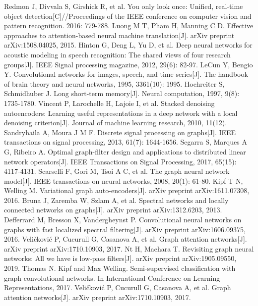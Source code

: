 \cleardoublepage


\begin{thebibliography}{99}  
    Redmon J, Divvala S, Girshick R, et al. You only look once: Unified, real-time object detection[C]//Proceedings of the IEEE conference on computer vision and pattern recognition. 2016: 779-788.  
    Luong M T, Pham H, Manning C D. Effective approaches to attention-based neural machine translation[J]. arXiv preprint arXiv:1508.04025, 2015.
    Hinton G, Deng L, Yu D, et al. Deep neural networks for acoustic modeling in speech recognition: The shared views of four research groups[J]. IEEE Signal processing magazine, 2012, 29(6): 82-97.
    LeCun Y, Bengio Y. Convolutional networks for images, speech, and time series[J]. The handbook of brain theory and neural networks, 1995, 3361(10): 1995. 
    Hochreiter S, Schmidhuber J. Long short-term memory[J]. Neural computation, 1997, 9(8): 1735-1780.
    Vincent P, Larochelle H, Lajoie I, et al. Stacked denoising autoencoders: Learning useful representations in a deep network with a local denoising criterion[J]. Journal of machine learning research, 2010, 11(12).
    Sandryhaila A, Moura J M F. Discrete signal processing on graphs[J]. IEEE transactions on signal processing, 2013, 61(7): 1644-1656.
    Segarra S, Marques A G, Ribeiro A. Optimal graph-filter design and applications to distributed linear network operators[J]. IEEE Transactions on Signal Processing, 2017, 65(15): 4117-4131.
    Scarselli F, Gori M, Tsoi A C, et al. The graph neural network model[J]. IEEE transactions on neural networks, 2008, 20(1): 61-80.
    Kipf T N, Welling M. Variational graph auto-encoders[J]. arXiv preprint arXiv:1611.07308, 2016.
    Bruna J, Zaremba W, Szlam A, et al. Spectral networks and locally connected networks on graphs[J]. arXiv preprint arXiv:1312.6203, 2013.
    Defferrard M, Bresson X, Vandergheynst P. Convolutional neural networks on graphs with fast localized spectral filtering[J]. arXiv preprint arXiv:1606.09375, 2016.
    Veličković P, Cucurull G, Casanova A, et al. Graph attention networks[J]. arXiv preprint arXiv:1710.10903, 2017.
    Nt H, Maehara T. Revisiting graph neural networks: All we have is low-pass filters[J]. arXiv preprint arXiv:1905.09550, 2019.
    Thomas N. Kipf and Max Welling. Semi-supervised classification with graph convolutional networks. In International Conference on Learning Representations, 2017.
    Veličković P, Cucurull G, Casanova A, et al. Graph attention networks[J]. arXiv preprint arXiv:1710.10903, 2017.
\end{thebibliography}

